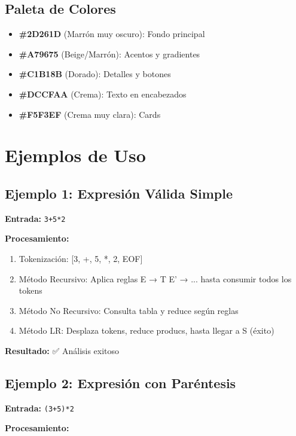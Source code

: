 \documentclass[12pt]{article}
\begin{document}
\subsection{Paleta de Colores}

\begin{itemize}
    \item \textbf{\#2D261D} (Marrón muy oscuro): Fondo principal
    \item \textbf{\#A79675} (Beige/Marrón): Acentos y gradientes
    \item \textbf{\#C1B18B} (Dorado): Detalles y botones
    \item \textbf{\#DCCFAA} (Crema): Texto en encabezados
    \item \textbf{\#F5F3EF} (Crema muy clara): Cards
\end{itemize}

\section{Ejemplos de Uso}

\subsection{Ejemplo 1: Expresión Válida Simple}

\textbf{Entrada:} \texttt{3+5*2}

\textbf{Procesamiento:}

\begin{enumerate}
    \item Tokenización: [3, +, 5, *, 2, EOF]
    \item Método Recursivo: Aplica reglas E → T E' → ... hasta consumir todos los tokens
    \item Método No Recursivo: Consulta tabla y reduce según reglas
    \item Método LR: Desplaza tokens, reduce producs, hasta llegar a S (éxito)
\end{enumerate}

\textbf{Resultado:} ✅ Análisis exitoso

\subsection{Ejemplo 2: Expresión con Paréntesis}

\textbf{Entrada:} \texttt{(3+5)*2}

\textbf{Procesamiento:}
\end{document}
